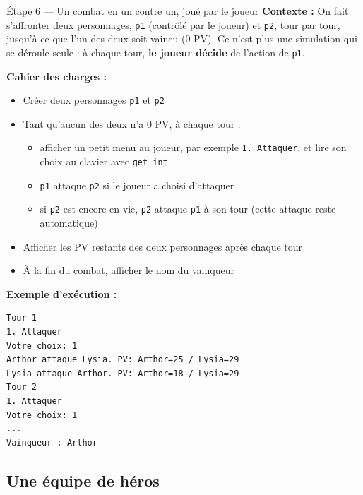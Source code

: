 \begin{UPSTIManipulation}{Étape 6 — Un combat en un contre un, joué par le joueur}
  \textbf{Contexte :} On fait s'affronter deux personnages, \texttt{p1} (contrôlé par le
  joueur) et \texttt{p2}, tour par tour, jusqu'à ce que l'un des deux soit vaincu (0 PV). Ce
  n'est plus une simulation qui se déroule seule : à chaque tour, \textbf{le joueur décide} de
  l'action de \texttt{p1}.

  \textbf{Cahier des charges :}
  \begin{itemize}
    \item Créer deux personnages \texttt{p1} et \texttt{p2}
    \item Tant qu'aucun des deux n'a 0 PV, à chaque tour :
      \begin{itemize}
        \item afficher un petit menu au joueur, par exemple \texttt{1. Attaquer}, et lire son
          choix au clavier avec \texttt{get\_int}
        \item \texttt{p1} attaque \texttt{p2} si le joueur a choisi d'attaquer
        \item si \texttt{p2} est encore en vie, \texttt{p2} attaque \texttt{p1} à son tour
          (cette attaque reste automatique)
      \end{itemize}
    \item Afficher les PV restants des deux personnages après chaque tour
    \item À la fin du combat, afficher le nom du vainqueur
  \end{itemize}

  \textbf{Exemple d'exécution :}
  \begin{lstlisting}[language=bash]
Tour 1
1. Attaquer
Votre choix: 1
Arthor attaque Lysia. PV: Arthor=25 / Lysia=29
Lysia attaque Arthor. PV: Arthor=18 / Lysia=29
Tour 2
1. Attaquer
Votre choix: 1
...
Vainqueur : Arthor
  \end{lstlisting}

\end{UPSTIManipulation}

\subsection{Une équipe de héros}

